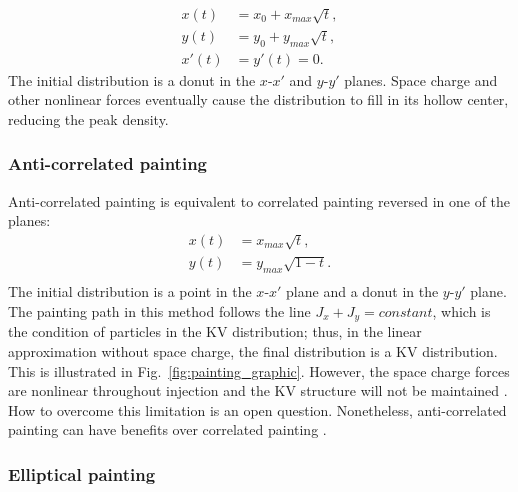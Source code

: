 %
\begin{equation}
\begin{aligned}
    {x}(t) &= x_0 + x_{max}\sqrt{t}, \\
    {y}(t) &= y_0 + y_{max}\sqrt{t}, \\
    x'(t) &= y'(t) = 0.
\end{aligned}
\end{equation}
%
The initial distribution is a donut in the $x$-$x'$ and $y$-$y'$ planes. Space charge and other nonlinear forces eventually cause the distribution to fill in its hollow center, reducing the peak density.


\subsubsection{Anti-correlated painting}

Anti-correlated painting is equivalent to correlated painting reversed in one of the planes:
%
\begin{equation}
\begin{aligned}
    {x}(t) &= x_{max}\sqrt{t}, \\
    {y}(t) &= y_{max}\sqrt{1 - t}. \\
\end{aligned}
\end{equation}
%
The initial distribution is a point in the $x$-$x'$ plane and a donut in the $y$-$y'$ plane. The painting path in this method follows the line $J_x + J_y = constant$, which is the condition of particles in the KV distribution; thus, in the linear approximation without space charge, the final distribution is a KV distribution. This is illustrated in Fig.~\ref{fig:painting_graphic}. However, the space charge forces are nonlinear throughout injection and the KV structure will not be maintained \cite{Crosbie1996}. How to overcome this limitation is an open question. Nonetheless, anti-correlated painting can have benefits over correlated painting \cite{Hotchi2020}.


\subsubsection{Elliptical painting}

